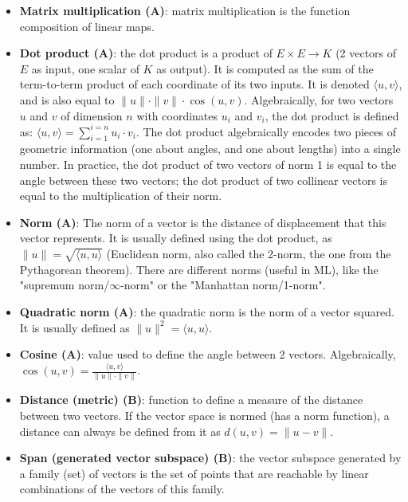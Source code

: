 \documentclass{article}
\begin{document}
\begin{itemize}
    \item \textbf{Matrix multiplication (A)}: matrix multiplication is the function composition of linear maps.
    
    \item \textbf{Dot product (A)}: the dot product is a product of $E \times E \rightarrow K$ (2 vectors of $E$ as input, one scalar of $K$ as output). It is computed as the sum of the term-to-term product of each coordinate of its two inputs. It is denoted $\langle u, v \rangle$, and is also equal to $\|u\| \cdot \|v\| \cdot \cos(u,v)$. Algebraically, for two vectors $u$ and $v$ of dimension $n$ with coordinates $u_i$ and $v_i$, the dot product is defined as: $\langle u, v \rangle = \sum_{i=1}^{i=n} u_i \cdot v_i$. The dot product algebraically encodes two pieces of geometric information (one about angles, and one about lengths) into a single number. In practice, the dot product of two vectors of norm 1 is equal to the angle between these two vectors; the dot product of two collinear vectors is equal to the multiplication of their norm.
    
    \item \textbf{Norm (A)}: The norm of a vector is the distance of displacement that this vector represents. It is usually defined using the dot product, as $\|u\| = \sqrt{\langle u, u \rangle}$ (Euclidean norm, also called the 2-norm, the one from the Pythagorean theorem). There are different norms (useful in ML), like the "supremum norm/$\infty$-norm" or the "Manhattan norm/1-norm".
    
    \item \textbf{Quadratic norm (A)}: the quadratic norm is the norm of a vector squared. It is usually defined as $\|u\|^2 = \langle u, u \rangle$.
    
    \item \textbf{Cosine (A)}: value used to define the angle between 2 vectors. Algebraically, $\cos(u, v) = \frac{\langle u, v \rangle}{\|u\| \cdot \|v\|}$.
    
    \item \textbf{Distance (metric) (B)}: function to define a measure of the distance between two vectors. If the vector space is normed (has a norm function), a distance can always be defined from it as $d(u, v) = \|u - v\|$.
    
    \item \textbf{Span (generated vector subspace) (B)}: the vector subspace generated by a family (set) of vectors is the set of points that are reachable by linear combinations of the vectors of this family.
    

\end{itemize}
\end{document}
